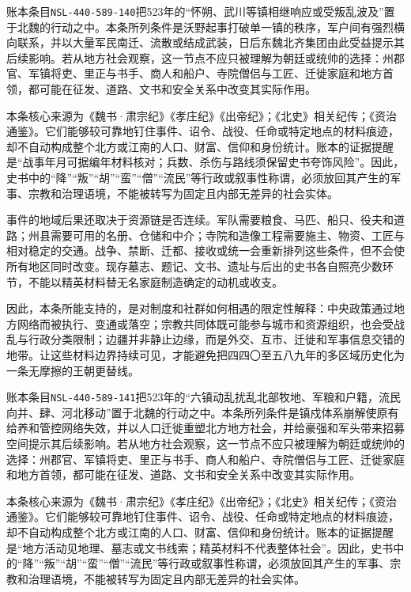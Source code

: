 账本条目\texttt{NSL-440-589-140}把523年的“怀朔、武川等镇相继响应或受叛乱波及”置于北魏的行动之中。本条所列条件是沃野起事打破单一镇的秩序，军户间有强烈横向联系，并以大量军民南迁、流散或结成武装，日后东魏北齐集团由此受益提示其后续影响。若从地方社会观察，这一节点不应只被理解为朝廷或统帅的选择：州郡官、军镇将吏、里正与书手、商人和船户、寺院僧侣与工匠、迁徙家庭和地方首领，都可能在征发、道路、文书和安全关系中改变其实际作用。

本条核心来源为《魏书·肃宗纪》《孝庄纪》《出帝纪》；《北史》相关纪传；《资治通鉴》。它们能够较可靠地钉住事件、诏令、战役、任命或特定地点的材料痕迹，却不自动构成整个北方或江南的人口、财富、信仰和身份统计。账本的证据提醒是“战事年月可据编年材料核对；兵数、杀伤与路线须保留史书夸饰风险”。因此，史书中的“降”“叛”“胡”“蛮”“僧”“流民”等行政或叙事性称谓，必须放回其产生的军事、宗教和治理语境，不能被转写为固定且内部无差异的社会实体。

事件的地域后果还取决于资源链是否连续。军队需要粮食、马匹、船只、役夫和道路；州县需要可用的名册、仓储和中介；寺院和造像工程需要施主、物资、工匠与相对稳定的交通。战争、禁断、迁都、接收或统一会重新排列这些条件，但不会使所有地区同时改变。现存墓志、题记、文书、遗址与后出的史书各自照亮少数环节，不能以精英材料替无名家庭制造确定的动机或收支。

因此，本条所能支持的，是对制度和社群如何相遇的限定性解释：中央政策通过地方网络而被执行、变通或落空；宗教共同体既可能参与城市和资源组织，也会受战乱与行政分类限制；边疆并非静止边缘，而是外交、互市、迁徙和军事信息交错的地带。让这些材料边界持续可见，才能避免把四四〇至五八九年的多区域历史化为一条无摩擦的王朝更替线。

账本条目\texttt{NSL-440-589-141}把523年的“六镇动乱扰乱北部牧地、军粮和户籍，流民向并、肆、河北移动”置于北魏的行动之中。本条所列条件是镇戍体系崩解使原有给养和管控网络失效，并以人口迁徙重塑北方地方社会，并给豪强和军头带来招募空间提示其后续影响。若从地方社会观察，这一节点不应只被理解为朝廷或统帅的选择：州郡官、军镇将吏、里正与书手、商人和船户、寺院僧侣与工匠、迁徙家庭和地方首领，都可能在征发、道路、文书和安全关系中改变其实际作用。

本条核心来源为《魏书·肃宗纪》《孝庄纪》《出帝纪》；《北史》相关纪传；《资治通鉴》。它们能够较可靠地钉住事件、诏令、战役、任命或特定地点的材料痕迹，却不自动构成整个北方或江南的人口、财富、信仰和身份统计。账本的证据提醒是“地方活动见地理、墓志或文书线索；精英材料不代表整体社会”。因此，史书中的“降”“叛”“胡”“蛮”“僧”“流民”等行政或叙事性称谓，必须放回其产生的军事、宗教和治理语境，不能被转写为固定且内部无差异的社会实体。

